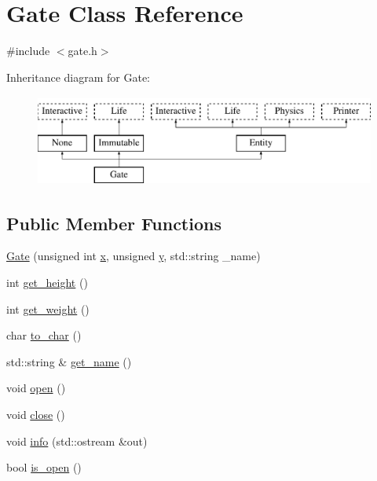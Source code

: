 \hypertarget{class_gate}{\section{Gate Class Reference}
\label{class_gate}
}


{\ttfamily \#include $<$gate.\-h$>$}

Inheritance diagram for Gate\-:\begin{figure}[H]
\begin{center}
\leavevmode
\includegraphics[height=3.000000cm]{class_gate}
\end{center}
\end{figure}
\subsection*{Public Member Functions}
\begin{DoxyCompactItemize}
\item 
\hyperlink{class_gate_a8c222415d9aa37b3057038e0fa1cb20f}{Gate} (unsigned int \hyperlink{class_entity_afa8f48eccdb09a290e2c1ded3f135363}{x}, unsigned \hyperlink{class_entity_a9d39843430829a89bb8233dbaadae4f1}{y}, std\-::string \-\_\-name)
\item 
int \hyperlink{class_gate_a92969268c88df32619ae44de87614cf8}{get\-\_\-height} ()
\item 
int \hyperlink{class_gate_a71358b21088e77ddcd7c1980e13ba063}{get\-\_\-weight} ()
\item 
char \hyperlink{class_gate_a4c957d7092b0c53a0a8e711142818dfa}{to\-\_\-char} ()
\item 
std\-::string \& \hyperlink{class_gate_a49c1fb6fd0f2bbf4a7593e7e6e0bfb48}{get\-\_\-name} ()
\item 
void \hyperlink{class_gate_a6b6e01294cd8f5dbb5c93831c5cd3c3f}{open} ()
\item 
void \hyperlink{class_gate_a3733611cc86dfe641915fcbfaf4d41c8}{close} ()
\item 
void \hyperlink{class_gate_a194b57934f4ab3ed226a7c5fb45693bd}{info} (std\-::ostream \&out)
\item 
bool \hyperlink{class_gate_a5cb8530f286fcbe2c40d7f396176b805}{is\-\_\-open} ()
\end{DoxyCompactItemize}
